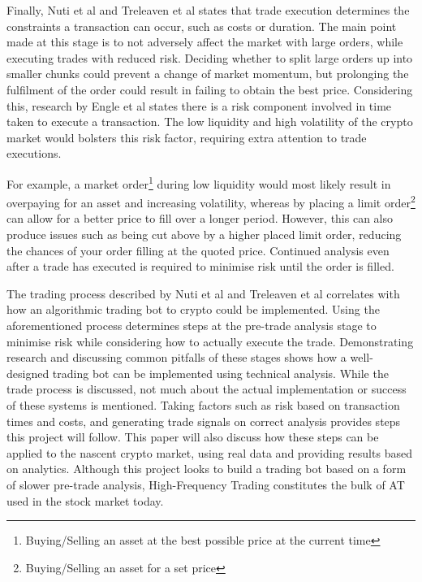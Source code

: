 Finally, Nuti et al \cite{ART:Nuti:2011} and Treleaven et al \cite{ART:Treleaven:2013} states that trade execution determines the constraints a transaction can occur, such as costs or duration. The main point made at this stage is to not adversely affect the market with large orders, while executing trades with reduced risk. Deciding whether to split large orders up into smaller chunks could prevent a change of market momentum, but prolonging the fulfilment of the order could result in failing to obtain the best price. Considering this, research by Engle et al \cite{ART:Robert:2012} states there is a risk component involved in time taken to execute a transaction. The low liquidity and high volatility of the crypto market would bolsters this risk factor, requiring extra attention to trade executions. 


For example, a market order\footnote{Buying/Selling an asset at the best possible price at the current time} during low liquidity would most likely result in overpaying for an asset and increasing volatility, whereas by placing a limit order\footnote{Buying/Selling an asset for a set price} can allow for a better price to fill over a longer period. However, this can also produce issues such as being cut above by a higher placed limit order, reducing the chances of your order filling at the quoted price. Continued analysis even after a trade has executed is required to minimise risk until the order is filled.

The trading process described by Nuti et al \cite{ART:Nuti:2011} and Treleaven et al \cite{ART:Treleaven:2013} correlates with how an algorithmic trading bot to crypto could be implemented. Using the aforementioned process determines steps at the pre-trade analysis stage to minimise risk while considering how to actually execute the trade. Demonstrating research and discussing common pitfalls of these stages shows how a well-designed trading bot can be implemented using technical analysis. While the trade process is discussed, not much about the actual implementation or success of these systems is mentioned. Taking factors such as risk based on transaction times and costs, and generating trade signals on correct analysis provides steps this project will follow. This paper will also discuss how these steps can be applied to the nascent crypto market, using real data and providing results based on analytics. Although this project looks to build a trading bot based on a form of slower pre-trade analysis, High-Frequency Trading constitutes the bulk of AT used in the stock market today. 

